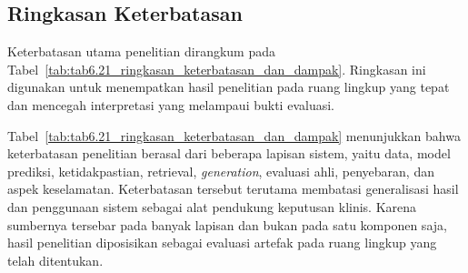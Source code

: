 \subsection{Ringkasan Keterbatasan}
\label{subsec:bab6-ringkasan-keterbatasan}

Keterbatasan utama penelitian dirangkum pada Tabel~\ref{tab:tab6.21_ringkasan_keterbatasan_dan_dampak}. Ringkasan ini digunakan untuk menempatkan hasil
penelitian pada ruang lingkup yang tepat dan mencegah interpretasi yang melampaui bukti evaluasi.



Tabel~\ref{tab:tab6.21_ringkasan_keterbatasan_dan_dampak} menunjukkan bahwa keterbatasan penelitian berasal dari beberapa lapisan sistem, yaitu data,
model prediksi, ketidakpastian, retrieval, \textit{generation}, evaluasi ahli, penyebaran, dan aspek keselamatan. Keterbatasan tersebut terutama membatasi
generalisasi hasil dan penggunaan sistem sebagai alat pendukung keputusan klinis. Karena sumbernya tersebar pada banyak lapisan dan bukan pada satu
komponen saja, hasil penelitian diposisikan sebagai evaluasi artefak pada ruang lingkup yang telah ditentukan.
